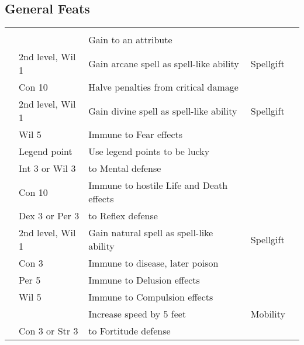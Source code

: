 \subsection{General Feats}
\begin{longtabuwrapper}
    \begin{longtabu}{>{\lcol}p{10em} >{\lcol}p{15em} >{\lcol}X >{\lcol}p{8em} >{\lcol}p{3em}}
         &  &  &  &  \\
         & \x & Gain  to an attribute           & \x &  \\
         & 2nd level, Wil 1 & Gain arcane spell as spell-like ability & Spellgift &  \\
         & Con 10 & Halve penalties from critical damage         & \x &  \\
         & 2nd level, Wil 1 & Gain divine spell as spell-like ability & Spellgift &  \\
         & Wil 5 & Immune to Fear effects                      & \x &  \\
         & Legend point & Use legend points to be lucky  & \x &  \\
         & Int 3 or Wil 3 &  to Mental defense           & \x &  \\
         & Con 10 & Immune to hostile Life and Death effects   & \x &  \\
         & Dex 3 or Per 3 &   to Reflex defense & \x &  \\
         & 2nd level, Wil 1 & Gain natural spell as spell-like ability & Spellgift &  \\
         & Con 3 & Immune to disease, later poison        & \x &  \\
         & Per 5 & Immune to Delusion effects          & \x &  \\
         & Wil 5 & Immune to Compulsion effects                 & \x &  \\
         & \x & Increase speed by 5 feet                           & Mobility &  \\
         & Con 3 or Str 3 &  to Fortitude defense        & \x &  \\


\end{longtabu}
\end{longtabuwrapper}
